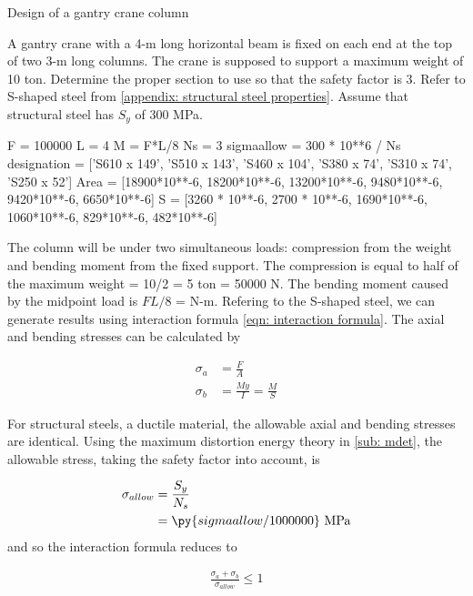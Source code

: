 \documentclass[
10pt,
a4paper,
openany,
svgnames,
]{book}
\begin{document}
\begin{example} Design of a gantry crane column

  A gantry crane with a 4-m long horizontal beam is fixed on each end at the top of two 3-m long columns. The crane is supposed to support a maximum weight of 10 ton. Determine the proper section to use so that the safety factor is 3. Refer to S-shaped steel from \cref{appendix: structural steel properties}. Assume that structural steel has $S_y$ of 300 MPa.

\end{example} 
\begin{solution}
  \begin{pycode}
    F = 100000
    L = 4
    M = F*L/8
    Ns = 3 
    sigmaallow = 300 * 10**6 / Ns
    designation = ['S610 x 149', 'S510 x 143', 'S460 x 104', 'S380 x 74', 'S310 x 74', 'S250 x 52']
    Area = [18900*10**-6, 18200*10**-6, 13200*10**-6, 9480*10**-6, 9420*10**-6, 6650*10**-6]
    S = [3260 * 10**-6, 2700 * 10**-6, 1690*10**-6, 1060*10**-6, 829*10**-6, 482*10**-6]
  \end{pycode}

  The column will be under two simultaneous loads: compression from the weight and bending moment from the fixed support. The compression is equal to half of the maximum weight = 10/2 = 5 ton = 50000 N. The bending moment caused by the midpoint load is $FL/8$ =  N-m. Refering to the S-shaped steel, we can generate results using interaction formula \cref{eqn: interaction formula}. The axial and bending stresses can be calculated by

  \begin{align*}
    \sigma_a &= \frac{F}{A} \\
    \sigma_b &= \frac{My}{I} = \frac{M}{S}
  \end{align*}

  For structural steels, a ductile material, the allowable axial and bending stresses are identical. Using the maximum distortion energy theory in \cref{sub: mdet}, the allowable stress, taking the safety factor into account, is

  \begin{align*}
    \sigma_{allow} &= \frac{S_y}{N_s} \\
                   &= \py{sigmaallow/1000000} \text{ MPa}
  \end{align*}
  and so the interaction formula reduces to

  \begin{align*}
    \frac{\sigma_a + \sigma_b}{\sigma_{allow}} \leqslant 1
  \end{align*}


\end{solution}
\end{document}
